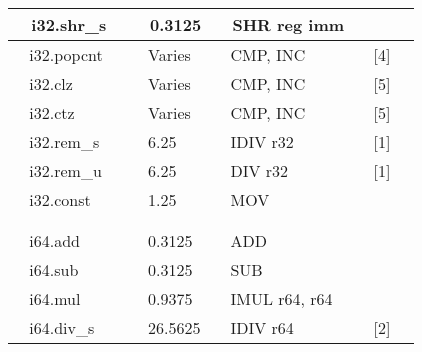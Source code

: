 \documentclass{article}
\begin{document}
\begin{table}
\begin{tabular}{|l|l|l|l|}
\hline
~ i32.shr\_s                                & ~ 0.3125                     & ~ SHR reg imm                                        &                       \\
\hline
~ i32.popcnt~~                              & ~ Varies                     & ~ CMP, INC                                           & ~ [4]                 \\
\hline
~ i32.clz                                   & ~ Varies                     & ~ CMP, INC                                           & ~ [5]                 \\
\hline
~ i32.ctz                                   & ~ Varies                     & ~ CMP, INC                                           & ~ [5]                 \\
\hline
~ i32.rem\_s                                & ~ 6.25                       & ~ IDIV r32                                           & ~ [1]                 \\
\hline
~ i32.rem\_u                                & ~ 6.25                       & ~ DIV r32                                            & ~ [1]                 \\
\hline
~ i32.const                                 & ~ 1.25                       & ~ MOV                                                &                       \\
\hline
                                            &                              &                                                      &                       \\
\hline
                                            &                              &                                                      &                       \\
\hline
~ i64.add                                   & ~ 0.3125                     & ~ ADD                                                &                       \\
\hline
~ i64.sub                                   & ~ 0.3125                     & ~ SUB                                                &                       \\
\hline
~ i64.mul                                   & ~ 0.9375                     & ~ IMUL r64, r64                                      &                       \\
\hline
~ i64.div\_s                                & ~ 26.5625                    & ~ IDIV r64                                           & ~ [2]~~               \\

\end{tabular}
\end{table}
\end{document}
